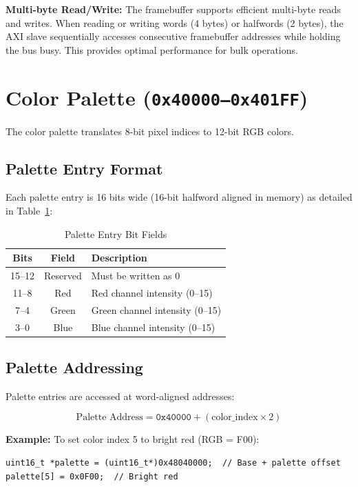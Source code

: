 \documentclass[11pt,letterpaper]{report}
\begin{document}
\textbf{Multi-byte Read/Write:} The framebuffer supports efficient multi-byte reads and writes. When reading or writing words (4 bytes) or halfwords (2 bytes), the AXI slave sequentially accesses consecutive framebuffer addresses while holding the bus busy. This provides optimal performance for bulk operations.

\section{Color Palette (\texttt{0x40000--0x401FF})}

The color palette translates 8-bit pixel indices to 12-bit RGB colors.

\subsection{Palette Entry Format}

Each palette entry is 16 bits wide (16-bit halfword aligned in memory) as detailed in Table~\ref{tab:palette_bits}:

\begin{table}[tbp]
\centering
\caption{Palette Entry Bit Fields}
\label{tab:palette_bits}
\begin{tabular}{ccp{6cm}}
\toprule
\textbf{Bits} & \textbf{Field} & \textbf{Description} \\
\midrule
15--12 & Reserved & Must be written as 0 \\
11--8 & Red & Red channel intensity (0--15) \\
7--4 & Green & Green channel intensity (0--15) \\
3--0 & Blue & Blue channel intensity (0--15) \\
\bottomrule
\end{tabular}
\end{table}

\subsection{Palette Addressing}

Palette entries are accessed at word-aligned addresses:

\begin{equation}
\text{Palette Address} = \texttt{0x40000} + (\text{color\_index} \times 2)
\end{equation}

\textbf{Example:} To set color index 5 to bright red (RGB = F00):

\begin{lstlisting}[style=c]
uint16_t *palette = (uint16_t*)0x48040000;  // Base + palette offset
palette[5] = 0x0F00;  // Bright red
\end{lstlisting}
\end{document}
